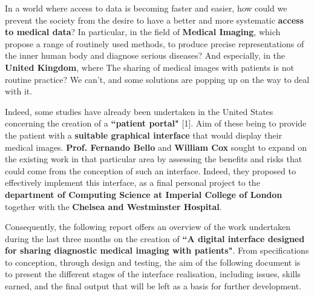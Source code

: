 In a world where access to data is becoming faster and easier, how could we prevent the society from the desire to have a better and more systematic \textbf{access to medical data}? In particular, in the field of \textbf{Medical Imaging}, which propose a range of routinely used methods, to produce precise representations of the inner human body and diagnose serious diseases? And especially, in the \textbf{United Kingdom}, where The sharing of medical images with patients is not routine practice? We can't, and some solutions are popping up on the way to deal with it.

\newline \vspace{5mm}
Indeed, some studies have already been undertaken in the United States concerning the creation of a \textbf{``patient portal"} [1]. Aim of these being to provide the patient with a \textbf{suitable graphical interface} that would display their medical images. \textbf{Prof. Fernando Bello} and \textbf{William Cox} sought to expand on the existing work in that particular area by assessing the benefits and risks that could come from the conception of such an interface. Indeed, they proposed to effectively implement this interface, as a final personal project to the \textbf{department of Computing Science at Imperial College of London} together with the \textbf{Chelsea and Westminster Hospital}. 

\newline \vspace{5mm}
Consequently, the following report offers an overview of the work undertaken during the last three months on the creation of \textbf{``A digital interface designed for sharing diagnostic medical imaging with patients"}. From specifications to conception, through design and testing, the aim of the following document is to present the different stages of the interface realisation, including issues, skills earned, and the final output that will be left as a basis for further development.





